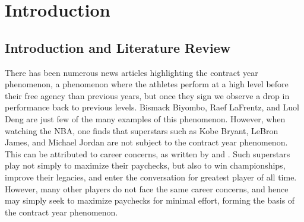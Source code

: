 \documentclass[12pt]{article}
\begin{document}
	\tableofcontents
	
	\clearpage
	
	\doublespacing
	
	
	\section{Introduction} \label{sec:introduction}
	
	\subsection{Introduction and Literature Review}
	
	There has been numerous news articles highlighting the contract year phenomenon, a phenomenon where the athletes perform at a high level before their free agency than previous years, but once they sign we observe a drop in performance back to previous levels. Bismack Biyombo, Raef LaFrentz, and Luol Deng are just few of the many examples of this phenomenon. However, when watching the NBA, one finds that superstars such as Kobe Bryant, LeBron James, and Michael Jordan are not subject to the contract year phenomenon. This can be attributed to career concerns, as written by \cite{holmstrom_contracts_1999} and \cite{gibbons_1992}. Such superstars play not simply to maximize their paychecks, but also to win championships, improve their legacies, and enter the conversation for greatest player of all time. However, many other players do not face the same career concerns, and hence may simply seek to maximize paychecks for minimal effort, forming the basis of the contract year phenomenon.
	
\end{document}
